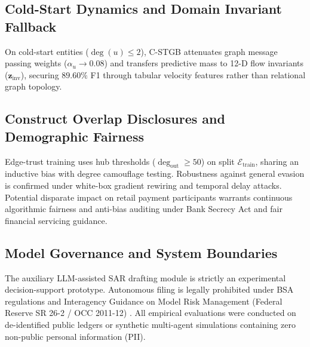 \subsection{Cold-Start Dynamics and Domain Invariant Fallback}
\label{sec:limitations_coldstart}
On cold-start entities ($\deg(u) \le 2$), C-STGB attenuates graph message passing weights ($\alpha_u \to 0.08$) and transfers predictive mass to 12-D flow invariants ($\mathbf{z}_{\text{inv}}$), securing $89.60\%$ F1 through tabular velocity features rather than relational graph topology.

\subsection{Construct Overlap Disclosures and Demographic Fairness}
\label{sec:limitations_construct_overlap}
Edge-trust training uses hub thresholds ($\deg_{\text{out}} \ge 50$) on split $\mathcal{E}_{\text{train}}$, sharing an inductive bias with degree camouflage testing. Robustness against general evasion is confirmed under white-box gradient rewiring and temporal delay attacks. Potential disparate impact on retail payment participants warrants continuous algorithmic fairness and anti-bias auditing under Bank Secrecy Act and fair financial servicing guidance.

\subsection{Model Governance and System Boundaries}
\label{sec:limitations_governance}
The auxiliary LLM-assisted SAR drafting module is strictly an experimental decision-support prototype. Autonomous filing is legally prohibited under BSA regulations and Interagency Guidance on Model Risk Management (Federal Reserve SR 26-2 / OCC 2011-12) \citep{fed2026sr262, occ201112}. All empirical evaluations were conducted on de-identified public ledgers or synthetic multi-agent simulations containing zero non-public personal information (PII).
